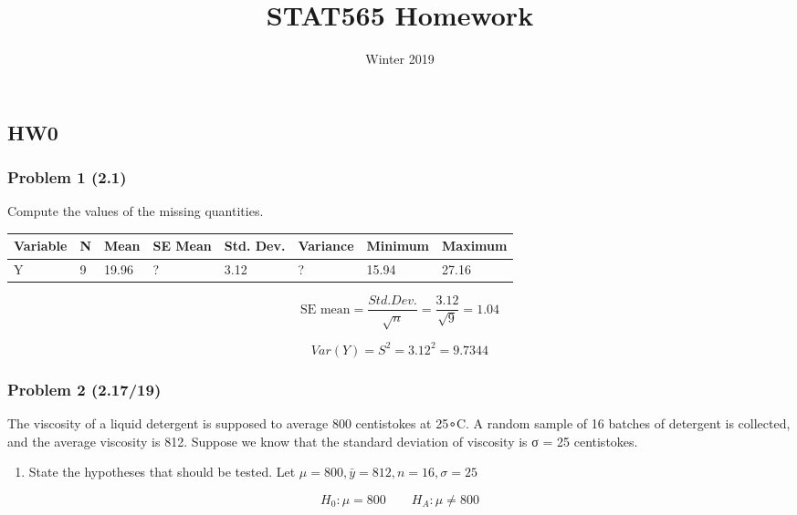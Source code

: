 \documentclass[]{article}
\title{STAT565 Homework}
\author{}
\date{Winter 2019}
\providecommand{\tightlist}{%
  \setlength{\itemsep}{0pt}\setlength{\parskip}{0pt}}
\begin{document}
\maketitle

\hypertarget{section}{%
\section{}\label{section}}

\hypertarget{hw0}{%
\subsection{HW0}\label{hw0}}

\hypertarget{problem-1-2.1}{%
\subsubsection{Problem 1 (2.1)}\label{problem-1-2.1}}

Compute the values of the missing quantities.

\begin{longtable}[]{@{}llllllll@{}}
\toprule
Variable & N & Mean & SE Mean & Std. Dev. & Variance & Minimum &
Maximum\tabularnewline
\midrule
\endhead
Y & 9 & 19.96 & ? & 3.12 & ? & 15.94 & 27.16\tabularnewline
\bottomrule
\end{longtable}

\[\text{SE mean}=\frac{Std.Dev.}{\sqrt{n}}=\frac{3.12}{\sqrt9}=1.04\]

\[Var(Y)=S^2=3.12^2=9.7344\]

\hypertarget{problem-2-2.1719}{%
\subsubsection{Problem 2 (2.17/19)}\label{problem-2-2.1719}}

The viscosity of a liquid detergent is supposed to average 800
centistokes at 25∘C. A random sample of 16 batches of detergent is
collected, and the average viscosity is 812. Suppose we know that the
standard deviation of viscosity is σ = 25 centistokes.

\begin{enumerate}
\def\labelenumi{(\alph{enumi})}
\tightlist
\item
  State the hypotheses that should be tested. Let
  \(\mu=800, \bar y=812, n=16, σ=25\)
\end{enumerate}

\[H_0: \mu=800\qquad H_A: \mu\neq800\]
\end{document}
